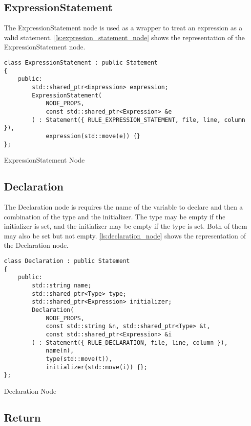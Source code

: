 \subsection{ExpressionStatement}

The ExpressionStatement node is used as a wrapper to treat an expression as a valid statement.
\autoref{ls:expression_statement_node} shows the representation of the ExpressionStatement node.

\begin{listing}[H]
\begin{verbatim}
class ExpressionStatement : public Statement
{
    public:
        std::shared_ptr<Expression> expression;
        ExpressionStatement(
            NODE_PROPS,
            const std::shared_ptr<Expression> &e
        ) : Statement({ RULE_EXPRESSION_STATEMENT, file, line, column }),
            expression(std::move(e)) {}
};
\end{verbatim}
\caption{ExpressionStatement Node}
\label{ls:expression_statement_node}
\end{listing}

\subsection{Declaration}

The Declaration node is requires the name of the variable to declare and then a combination of the type and the initializer.
The type may be empty if the initializer is set, and the initializer may be empty if the type is set. Both of them may also be set
but not empty.
\autoref{ls:declaration_node} shows the representation of the Declaration node.

\begin{listing}[H]
\begin{verbatim}
class Declaration : public Statement
{
    public:
        std::string name;
        std::shared_ptr<Type> type;
        std::shared_ptr<Expression> initializer;
        Declaration(
            NODE_PROPS,
            const std::string &n, std::shared_ptr<Type> &t,
            const std::shared_ptr<Expression> &i
        ) : Statement({ RULE_DECLARATION, file, line, column }),
            name(n),
            type(std::move(t)),
            initializer(std::move(i)) {};
};
\end{verbatim}
\caption{Declaration Node}
\label{ls:declaration_node}
\end{listing}

\subsection{Return}

